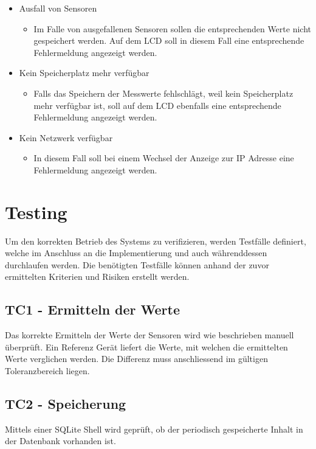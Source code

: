 \documentclass[
    10pt,
    a4paper,
]{scrartcl}
\begin{document}
\begin{itemize}
    \item Ausfall von Sensoren
        \begin{itemize}
            \item Im Falle von ausgefallenen Sensoren sollen die entsprechenden Werte
                nicht gespeichert werden. Auf dem LCD soll in diesem Fall eine
                entsprechende Fehlermeldung angezeigt werden.
        \end{itemize}
    \item Kein Speicherplatz mehr verfügbar
        \begin{itemize}
            \item Falls das Speichern der Messwerte fehlschlägt, weil kein Speicherplatz
                mehr verfügbar ist, soll auf dem LCD ebenfalls eine entsprechende
                Fehlermeldung angezeigt werden.
        \end{itemize}
    \item Kein Netzwerk verfügbar
        \begin{itemize}
            \item In diesem Fall soll bei einem Wechsel der Anzeige zur IP Adresse eine
                Fehlermeldung angezeigt werden.
        \end{itemize}
\end{itemize}

\section{Testing}

Um den korrekten Betrieb des Systems zu verifizieren, werden Testfälle definiert, welche
im Anschluss an die Implementierung und auch währenddessen durchlaufen werden. Die
benötigten Testfälle können anhand der zuvor ermittelten Kriterien und Risiken erstellt
werden.

\subsection{TC1 - Ermitteln der Werte}
Das korrekte Ermitteln der Werte der Sensoren wird wie beschrieben manuell überprüft. Ein
Referenz Gerät liefert die Werte, mit welchen die ermittelten Werte verglichen werden.
Die Differenz muss anschliessend im gültigen Toleranzbereich liegen.

\subsection{TC2 - Speicherung}
Mittels einer SQLite Shell wird geprüft, ob der periodisch gespeicherte Inhalt in der
Datenbank vorhanden ist.
\end{document}
